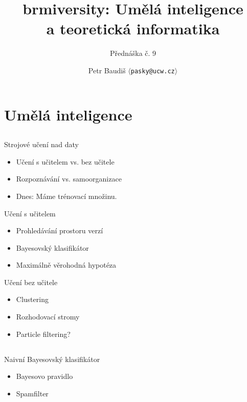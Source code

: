 \documentclass{beamer}
\begin{document}

\title{brmiversity: Umělá inteligence \\ a teoretická informatika}
\subtitle{Přednáška č. 9}
\author{Petr Baudiš $\langle${\tt pasky@ucw.cz}$\rangle$}
\date{}
\frame{\titlepage}

\section{Umělá inteligence}

\subsection{}
\begin{frame}{Strojové učení nad daty}
\begin{itemize}
\item Učení s učitelem vs. bez učitele
\item Rozpoznávání vs. samoorganizace
\item Dnes: Máme trénovací množinu.
\end{itemize}
\begin{block}{Učení s učitelem}
\begin{itemize}
\item Prohledávání prostoru verzí
\item Bayesovský klasifikátor
\item Maximálně věrohodná hypotéza
\end{itemize}
\end{block}
\begin{block}{Učení bez učitele}
\begin{itemize}
\item Clustering
\item Rozhodovací stromy
\item Particle filtering?
\end{itemize}
\end{block}
\end{frame}

\subsection{}
\begin{frame}{Naivní Bayesovský klasifikátor}
\begin{itemize}
\item Bayesovo pravidlo
\item Spamfilter
\end{itemize}
\end{frame}
\end{document}
